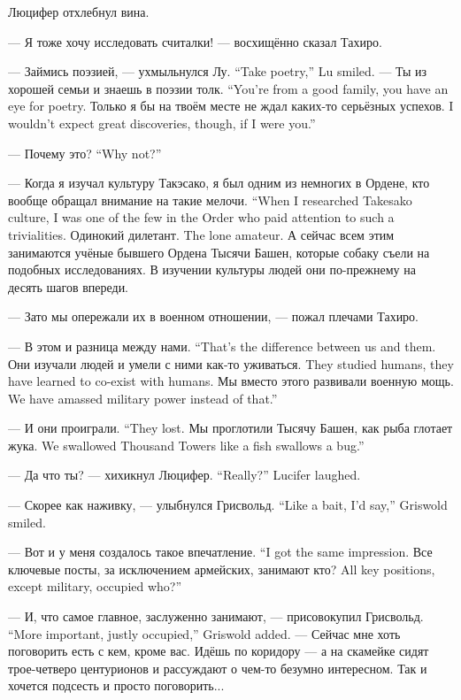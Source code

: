 Люцифер отхлебнул вина.

--- Я тоже хочу исследовать считалки! --- восхищённо сказал Тахиро.

{--- Займись поэзией, --- ухмыльнулся Лу.}
{``Take poetry,'' Lu smiled.}
{--- Ты из хорошей семьи и знаешь в поэзии толк.}
{``You're from a good family, you have an eye for poetry.}
{Только я бы на твоём месте не ждал каких-то серьёзных успехов.}
{I wouldn't expect great discoveries, though, if I were you.''}

{--- Почему это?}
{``Why not?''}

{--- Когда я изучал культуру Такэсако, я был одним из немногих в Ордене, кто вообще обращал внимание на такие мелочи.}
{``When I researched Takesako culture, I was one of the few in the Order who paid attention to such a trivialities.}
{Одинокий дилетант.}
{The lone amateur.}
А сейчас всем этим занимаются учёные бывшего Ордена Тысячи Башен, которые собаку съели на подобных исследованиях.
В изучении культуры людей они по-прежнему на десять шагов впереди.

--- Зато мы опережали их в военном отношении, --- пожал плечами Тахиро.

{--- В этом и разница между нами.}
{``That's the difference between us and them.}
{Они изучали людей и умели с ними как-то уживаться.}
{They studied humans, they have learned to co-exist with humans.}
{Мы вместо этого развивали военную мощь.}
{We have amassed military power instead of that.''}

{--- И они проиграли.}
{``They lost.}
{Мы проглотили Тысячу Башен, как рыба глотает жука.}
{We swallowed Thousand Towers like a fish swallows a bug.''}

{--- Да что ты? --- хихикнул Люцифер.}
{``Really?'' Lucifer laughed.}

{--- Скорее как наживку, --- улыбнулся Грисвольд.}
{``Like a bait, I'd say,'' Griswold smiled.}

{--- Вот и у меня создалось такое впечатление.}
{``I got the same impression.}
{Все ключевые посты, за исключением армейских, занимают кто?}
{All key positions, except military, occupied who?''}

{--- И, что самое главное, заслуженно занимают, --- присовокупил Грисвольд.}
{``More important, justly occupied,'' Griswold added.}
--- Сейчас мне хоть поговорить есть с кем, кроме вас.
Идёшь по коридору --- а на скамейке сидят трое-четверо центурионов и рассуждают о чем-то безумно интересном.
Так и хочется подсесть и просто поговорить...

